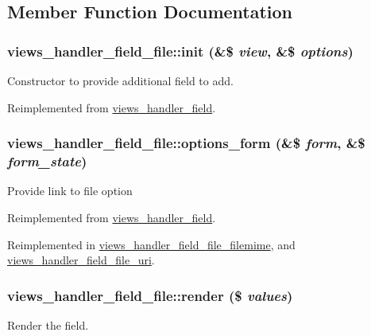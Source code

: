 \subsection{Member Function Documentation}
\hypertarget{classviews__handler__field__file_aa0c76118aaf12d0938111d093411c016}{
\subsubsection[{init}]{\setlength{\rightskip}{0pt plus 5cm}views\_\-handler\_\-field\_\-file::init (\&\$ {\em view}, \/  \&\$ {\em options})}}
\label{classviews__handler__field__file_aa0c76118aaf12d0938111d093411c016}
Constructor to provide additional field to add. 

Reimplemented from \hyperlink{classviews__handler__field_a3a290c7df3ead81e5cd244ad5335b1cc}{views\_\-handler\_\-field}.\hypertarget{classviews__handler__field__file_aab95242357e45be9c4fbbced1f625d7b}{
\subsubsection[{options\_\-form}]{\setlength{\rightskip}{0pt plus 5cm}views\_\-handler\_\-field\_\-file::options\_\-form (\&\$ {\em form}, \/  \&\$ {\em form\_\-state})}}
\label{classviews__handler__field__file_aab95242357e45be9c4fbbced1f625d7b}
Provide link to file option 

Reimplemented from \hyperlink{classviews__handler__field_a0435d161922b7b4b84f02a2e79bb947a}{views\_\-handler\_\-field}.

Reimplemented in \hyperlink{classviews__handler__field__file__filemime_a0ca50231798333edb2dbe1a53d560b8f}{views\_\-handler\_\-field\_\-file\_\-filemime}, and \hyperlink{classviews__handler__field__file__uri_aef98f71a75b7285bcb2dc6c7ddaebc55}{views\_\-handler\_\-field\_\-file\_\-uri}.\hypertarget{classviews__handler__field__file_a624c3ed9f9f4b194e2a9a0b7d6acb384}{
\subsubsection[{render}]{\setlength{\rightskip}{0pt plus 5cm}views\_\-handler\_\-field\_\-file::render (\$ {\em values})}}
\label{classviews__handler__field__file_a624c3ed9f9f4b194e2a9a0b7d6acb384}
Render the field.



